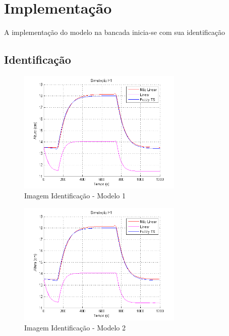 %

\chapter{Implementação} \label{capImp}

A implementação do modelo na bancada inicia-se com sua identificação

\section{Identificação}

\begin{figure}[H]
	\centering
	\includegraphics[width=0.7\textwidth]{img/FM_h1_5_10_15.png}
	\caption{Imagem Identificação - Modelo 1}
	\label{figH1TS2}
\end{figure}

\begin{figure}[H]
	\centering
	\includegraphics[width=0.7\textwidth]{img/FM_h1_5_10_15.png}
	\caption{Imagem Identificação - Modelo 2}
	\label{figH1TS2}
\end{figure}


